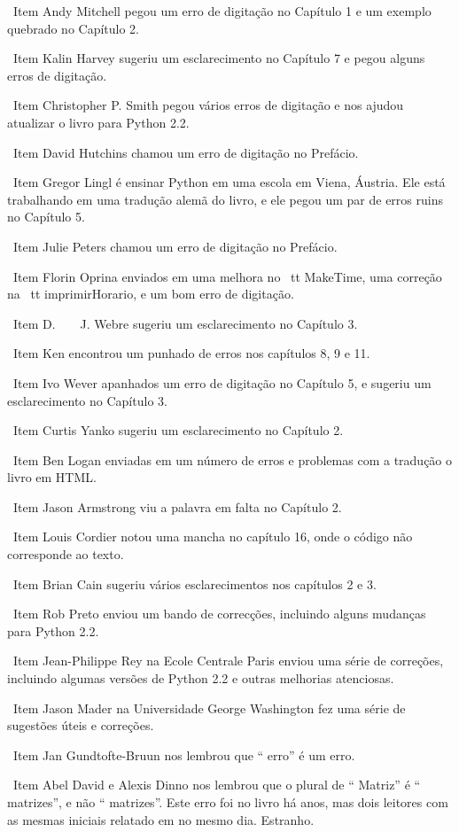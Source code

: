 \documentclass[10pt]{book}
\begin{document}
\ Item Andy Mitchell pegou um erro de digitação no Capítulo 1 e um exemplo quebrado
no Capítulo 2.

\ Item Kalin Harvey sugeriu um esclarecimento no Capítulo 7 e
pegou alguns erros de digitação.

\ Item Christopher P. Smith pegou vários erros de digitação e nos ajudou
atualizar o livro para Python 2.2.

\ Item David Hutchins chamou um erro de digitação no Prefácio.

\ Item Gregor Lingl é ensinar Python em uma escola em Viena,
Áustria. Ele está trabalhando em uma tradução alemã do livro,
e ele pegou um par de erros ruins no Capítulo 5.

\ Item Julie Peters chamou um erro de digitação no Prefácio.

\ Item Florin Oprina enviados em uma melhora no {\ tt MakeTime},
uma correção na {\ tt imprimirHorario}, e um bom erro de digitação.

\ Item D. ~ ~ J. Webre sugeriu um esclarecimento no Capítulo 3.

\ Item Ken encontrou um punhado de erros nos capítulos 8, 9 e 11.

\ Item Ivo Wever apanhados um erro de digitação no Capítulo 5, e sugeriu um esclarecimento
no Capítulo 3.

\ Item Curtis Yanko sugeriu um esclarecimento no Capítulo 2.

\ Item Ben Logan enviadas em um número de erros e problemas com a tradução
o livro em HTML.

\ Item Jason Armstrong viu a palavra em falta no Capítulo 2.

\ Item Louis Cordier notou uma mancha no capítulo 16, onde o código
não corresponde ao texto.

\ Item Brian Cain sugeriu vários esclarecimentos nos capítulos 2 e 3.

\ Item Rob Preto enviou um bando de correcções, incluindo alguns
mudanças para Python 2.2.

\ Item Jean-Philippe Rey na Ecole Centrale
Paris enviou uma série de correções, incluindo algumas versões de Python 2.2
e outras melhorias atenciosas.

\ Item Jason Mader na Universidade George Washington fez uma série
de sugestões úteis e correções.

\ Item Jan Gundtofte-Bruun nos lembrou que `` erro'' é um erro.

\ Item Abel David e Alexis Dinno nos lembrou que o plural de
`` Matriz'' é `` matrizes'', e não `` matrizes''. Este erro foi no
livro há anos, mas dois leitores com as mesmas iniciais relatado em
no mesmo dia. Estranho.
\end{document}
